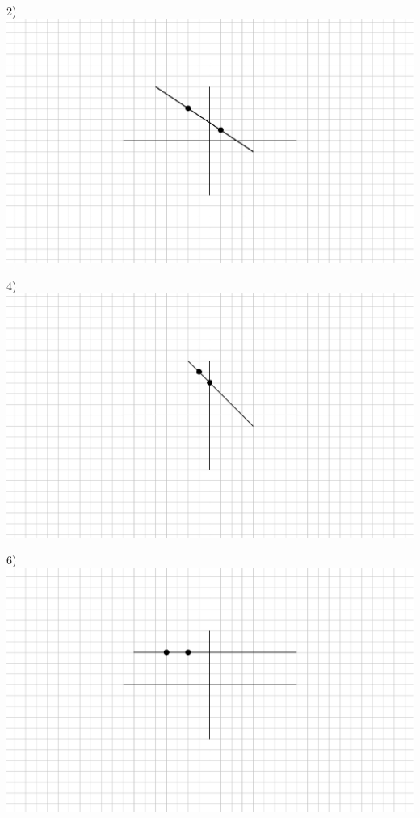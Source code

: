 \begin{multicols}{2}
  2)\\
	\includegraphics[scale=.8,bb = 115 65 310 190, clip=true]{II_1_3cp-7.eps}
  
  
  
  4)\\
	\includegraphics[scale=.8,bb = 115 65 310 190, clip=true]{II_1_3cp-9.eps}
  
  6)\\  
  \includegraphics[scale=.8,bb = 115 65 310 190, clip=true]{II_1_3cp-10.eps}
\end{multicols}

